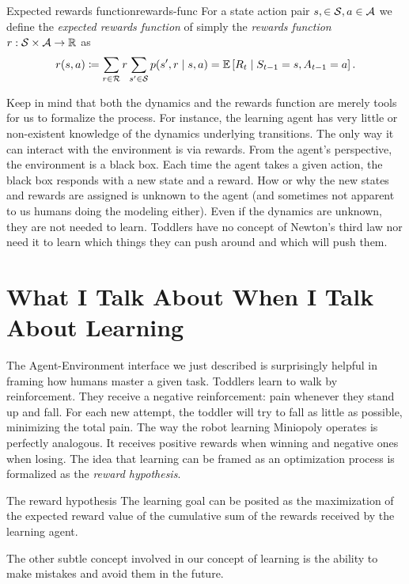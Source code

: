 \begin{dfn}{Expected rewards function}{rewards-func}
	For a state action pair $s, \in \mathcal{S}, a \in \mathcal{A}$ we define the
	\emph{expected rewards function} of simply the \emph{rewards function} $r:
	\mathcal{S} \times \mathcal{A} \to \mathbb{R}$ as
	\[
		r(s, a) \coloneqq \sum_{r \in \mathcal{R}} r \sum_{s' \in \mathcal{S}} p(s', r \mid s, a) = \mathbb{E} \left[ R_t \mid S_{t-1} = s, A_{t-1} = a \right].
	\]
\end{dfn}

Keep in mind that both the dynamics and the rewards function are merely tools
for us to formalize the process. For instance, the learning agent has very
little or non-existent knowledge of the dynamics underlying transitions. The
only way it can interact with the environment is via rewards. From the agent's
perspective, the environment is a black box. Each time the agent takes a given
action, the black box responds with a new state and a reward. How or why the new
states and rewards are assigned is unknown to the agent (and sometimes not
apparent to us humans doing the modeling either). Even if the dynamics are
unknown, they are not needed to learn.  Toddlers have no concept of Newton's
third law nor need it to learn which things they can push around and which will
push them.

\section{What I Talk About When I Talk About Learning}

The Agent-Environment
interface we just described is surprisingly helpful in framing how humans master
a given task. Toddlers learn to walk by reinforcement.  They receive a negative
reinforcement: pain whenever they stand up and fall.  For each new attempt, the
toddler will try to fall as little as possible, minimizing the total pain. The
way the robot learning Miniopoly operates is perfectly analogous. It receives
positive rewards when winning and negative ones when losing.  The idea that
learning can be framed as an optimization process is formalized as the
\emph{reward hypothesis}.

\begin{remark}{The reward hypothesis}
	The learning goal can be posited as the maximization of the expected reward
	value of the cumulative sum of the rewards received by the learning agent. 
\end{remark}

The other subtle concept involved in our concept of learning is the
ability to make mistakes and avoid them in the future.

